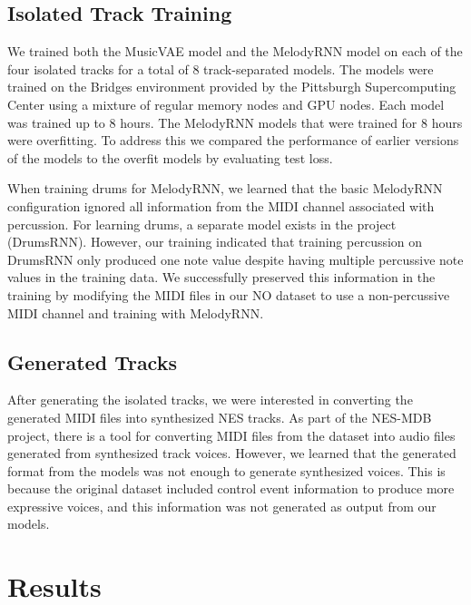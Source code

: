 \documentclass{article}
\begin{document}
\subsection{Isolated Track Training}
We trained both the MusicVAE model and the MelodyRNN model on each of the four isolated tracks for a total of 8 track-separated models. The models were trained on the Bridges environment provided by the Pittsburgh Supercomputing Center using a mixture of regular memory nodes and GPU nodes. Each model was trained up to 8 hours. The MelodyRNN models that were trained for 8 hours were overfitting. To address this we compared the performance of earlier versions of the models to the overfit models by evaluating test loss.

When training drums for MelodyRNN, we learned that the basic MelodyRNN configuration ignored all information from the MIDI channel associated with percussion. For learning drums, a separate model exists in the project (DrumsRNN). However, our training indicated that training percussion on DrumsRNN only produced one note value despite having multiple percussive note values in the training data. We successfully preserved this information in the training by modifying the MIDI files in our NO dataset to use a non-percussive MIDI channel and training with MelodyRNN.


\subsection{Generated Tracks}
After generating the isolated tracks, we were interested in converting the generated MIDI files into synthesized NES tracks. As part of the NES-MDB project, there is a tool for converting MIDI files from the dataset into audio files generated from synthesized track voices. However, we learned that the generated format from the models was not enough to generate synthesized voices. This is because the original dataset included control event information to produce more expressive voices, and this information was not generated as output from our models.


\section{Results}
\end{document}
